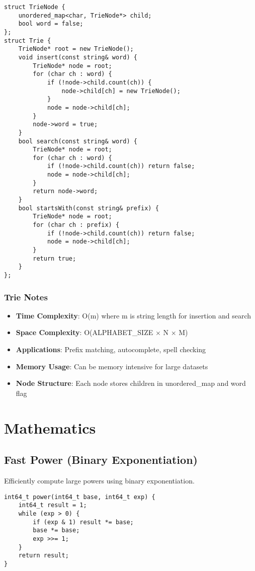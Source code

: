 \documentclass[11pt,a4paper]{article}
\begin{document}
\begin{lstlisting}[caption={Trie Implementation}]
struct TrieNode {
    unordered_map<char, TrieNode*> child;
    bool word = false;
};
struct Trie {
    TrieNode* root = new TrieNode();
    void insert(const string& word) {
        TrieNode* node = root;
        for (char ch : word) {
            if (!node->child.count(ch)) {
                node->child[ch] = new TrieNode();
            }
            node = node->child[ch];
        }
        node->word = true;
    }
    bool search(const string& word) {
        TrieNode* node = root;
        for (char ch : word) {
            if (!node->child.count(ch)) return false;
            node = node->child[ch];
        }
        return node->word;
    }
    bool startsWith(const string& prefix) {
        TrieNode* node = root;
        for (char ch : prefix) {
            if (!node->child.count(ch)) return false;
            node = node->child[ch];
        }
        return true;
    }
};
\end{lstlisting}

\subsubsection*{Trie Notes}
\begin{itemize}
\item \textbf{Time Complexity}: O(m) where m is string length for insertion and search
\item \textbf{Space Complexity}: O(ALPHABET\_SIZE $\times$ N $\times$ M)
\item \textbf{Applications}: Prefix matching, autocomplete, spell checking
\item \textbf{Memory Usage}: Can be memory intensive for large datasets
\item \textbf{Node Structure}: Each node stores children in unordered\_map and word flag
\end{itemize}

\newpage
\section{Mathematics}

\subsection{Fast Power (Binary Exponentiation)}
Efficiently compute large powers using binary exponentiation.


\begin{lstlisting}[caption={Binary Exponentiation - Iterative}]
int64_t power(int64_t base, int64_t exp) {
    int64_t result = 1;
    while (exp > 0) {
        if (exp & 1) result *= base;
        base *= base;
        exp >>= 1;
    }
    return result;
}
\end{lstlisting}
\end{document}
